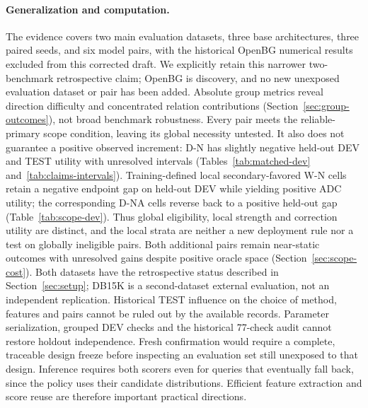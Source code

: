 \documentclass[11pt,a4paper]{article}
\begin{document}
\paragraph{Generalization and computation.}
The evidence covers two main evaluation datasets, three base architectures, three paired seeds, and six model pairs, with the historical OpenBG numerical results excluded from this corrected draft. We explicitly retain this narrower two-benchmark retrospective claim; OpenBG is discovery, and no new unexposed evaluation dataset or pair has been added. Absolute group metrics reveal direction difficulty and concentrated relation contributions (Section~\ref{sec:group-outcomes}), not broad benchmark robustness. Every pair meets the reliable-primary scope condition, leaving its global necessity untested. It also does not guarantee a positive observed increment: D-N has slightly negative held-out DEV and TEST utility with unresolved intervals (Tables~\ref{tab:matched-dev} and~\ref{tab:claims-intervals}). Training-defined local secondary-favored W-N cells retain a negative endpoint gap on held-out DEV while yielding positive ADC utility; the corresponding D-NA cells reverse back to a positive held-out gap (Table~\ref{tab:scope-dev}). Thus global eligibility, local strength and correction utility are distinct, and the local strata are neither a new deployment rule nor a test on globally ineligible pairs. Both additional pairs remain near-static outcomes with unresolved gains despite positive oracle space (Section~\ref{sec:scope-cost}). Both datasets have the retrospective status described in Section~\ref{sec:setup}; DB15K is a second-dataset external evaluation, not an independent replication. Historical TEST influence on the choice of method, features and pairs cannot be ruled out by the available records. Parameter serialization, grouped DEV checks and the historical 77-check audit cannot restore holdout independence. Fresh confirmation would require a complete, traceable design freeze before inspecting an evaluation set still unexposed to that design. Inference requires both scorers even for queries that eventually fall back, since the policy uses their candidate distributions. Efficient feature extraction and score reuse are therefore important practical directions.
\end{document}

